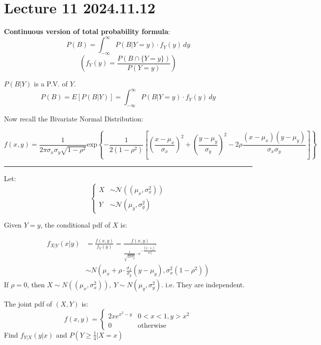 \documentclass{article}
\begin{document}
\section{Lecture 11 2024.11.12}


\begin{definition}
    \textbf{Continuous version of total probability formula}:
    \[ P(B) = \int_{-\infty}^{\infty}P(B|Y=y) \cdot f_{Y}(y) \, dy \]
    \[ \left(f_{Y}(y) = \frac{P(B\cap \{Y=y\})}{P(Y=y)}\right) \]

$ P(B|Y) $ is a P.V. of $Y$.
\[P(B) = E[P(B|Y)] = \int_{-\infty}^{\infty} P(B|Y=y) \cdot f_{Y}(y) \, dy\]

\end{definition}

Now recall the Bivariate Normal Distribution:

\[ f(x,y) = \frac{1}{2\pi \sigma_{x} \sigma_{y} \sqrt{1-\rho^{2}}} \text{exp} \left\{ -\frac{1}{2(1-\rho^{2})} \left[ \left( \frac{x-\mu_{x}}{\sigma_{x}} \right)^{2} + \left( \frac{y-\mu_{y}}{\sigma_{y}} \right)^{2} -2 \rho \frac{(x-\mu_{x})(y-\mu_{y})}{\sigma_{x} \sigma_{y}} \right] \right\} \]

\rule{35em}{0.05ex}

\bigskip

Let:
\[
\left\{
    \begin{aligned}
        X &\sim \mathcal{N} ((\mu_{x},\sigma_{x}^{2}))\\
        Y &\sim \mathcal{N} (\mu_{y}, \sigma_{y}^{2})
    \end{aligned}
\right.
\]

Given $Y = y$, the conditional pdf of $X$ is:

\begin{align*}
    f_{X|Y}(x|y) &= \frac{f(x,y)}{f_{Y}(y)} = \frac{f(x,y)}{\frac{1}{\sqrt{2\pi \sigma_{y}^{2}}} \cdot e^{-\frac{(y-\mu_{y})^{2}}{2\sigma_{y}^{2}}}}\\
                 &\sim N(\mu_{x} + \rho \cdot \frac{\sigma_{x}}{\sigma_{y}}(y-\mu_{y}), \sigma_{x}^{2}(1-\rho^{2})) 
\end{align*}
 If $\rho = 0$, then $X \sim N((\mu_{x},\sigma_{x}^{2})),\  Y \sim N(\mu_{y}, \sigma_{y}^{2})$.
 i.e. They are independent.

\begin{quiz}
    The joint pdf of $(X,Y)$ is:
    \[ f(x,y) = \begin{cases}
        2xe^{x^{2}-y} & 0<x<1,y>x^{2}\\
        0 & \text{otherwise}
    \end{cases} \]
Find $f_{Y|X}(y|x)$ and $P(Y\geq \frac{1}{4} | X=x)$
\end{quiz}
\end{document}
